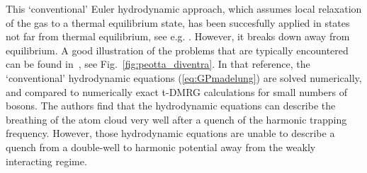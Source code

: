 \documentclass[onecolumn,amsfonts,showpacs,superscriptaddress]{revtex4-1}
\begin{document}
This `conventional' Euler hydrodynamic approach, which assumes local relaxation of the gas to a thermal equilibrium state, has been succesfully applied in states not far from thermal equilibrium, see e.g. \citep{menotti2002collective,ohberg2002dynamical,pedri2003violation}. However, it breaks down away from equilibrium. A good illustration of the problems that are typically encountered can be found in~\citep{peotta2014quantum}, see Fig.~\ref{fig:peotta_diventra}. In that reference, the `conventional' hydrodynamic equations (\ref{eq:GPmadelung}) are solved numerically, and compared to numerically exact t-DMRG calculations for small numbers of bosons. The authors find that the hydrodynamic equations can describe the breathing of the atom cloud very well after a quench of the harmonic trapping frequency. However, those hydrodynamic equations are unable to describe a quench from a double-well to harmonic potential away from the weakly interacting regime.
\end{document}
